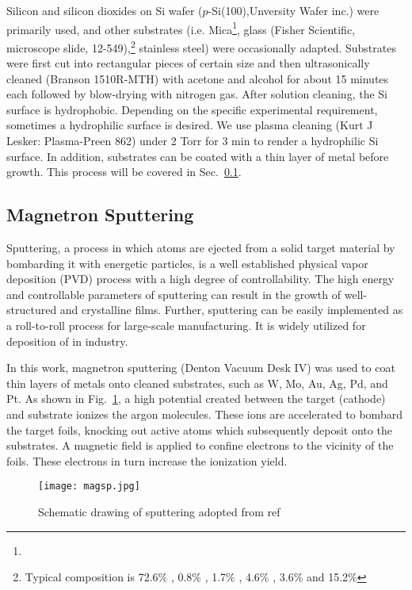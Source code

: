 Silicon and silicon dioxides on Si wafer ($p$-Si(100),Unversity Wafer inc.) were primarily used, and other substrates (i.e. Mica\footnote{ }, glass (Fisher Scientific, microscope slide, 12-549),\footnote{Typical composition is 72.6\% , 0.8\% , 1.7\% , 4.6\% , 3.6\%  and 15.2\% } stainless steel) were occasionally adapted. Substrates were first cut into rectangular pieces of certain size and then ultrasonically cleaned (Branson 1510R-MTH) with acetone and alcohol for about 15 minutes each followed by blow-drying with nitrogen gas. After solution cleaning, the Si surface is hydrophobic. Depending on the specific experimental requirement, sometimes a hydrophilic surface is desired. We use plasma cleaning (Kurt J Lesker: Plasma-Preen 862) under 2 Torr  for 3 min to render a hydrophilic Si surface. In addition, substrates can be coated with a thin layer of metal before growth. This process will be covered  in Sec.~\ref{sec:mag}.


\subsection{Magnetron Sputtering}\label{sec:mag}

Sputtering, a process in which atoms are ejected from a solid target material by bombarding it with energetic particles, is a well established physical vapor deposition (PVD) process with a high degree of controllability. The high energy and controllable parameters of sputtering can result in the growth of well-structured and crystalline films. Further, sputtering can be easily implemented as a roll-to-roll process for large-scale manufacturing. It is widely utilized for deposition of  in industry.

In this work, magnetron sputtering (Denton Vacuum Desk IV) was used to coat thin layers of metals onto cleaned substrates, such as W, Mo, Au, Ag, Pd, and Pt. As shown in Fig.~\ref{fig:ch2magsp}, a high potential created between the target (cathode) and substrate ionizes the argon molecules. These ions are accelerated to bombard the target foils, knocking out active atoms which subsequently deposit onto the substrates. A magnetic field is applied to confine electrons to the vicinity of the foils. These electrons in turn increase the ionization yield. 

\begin{figure}[htb]
\centering
\texttt{[image: magsp.jpg]}
\caption[magnetron sputtering system]{Schematic drawing of sputtering adopted from ref\cite{Song2008}}
\label{fig:ch2magsp}
\end{figure}

